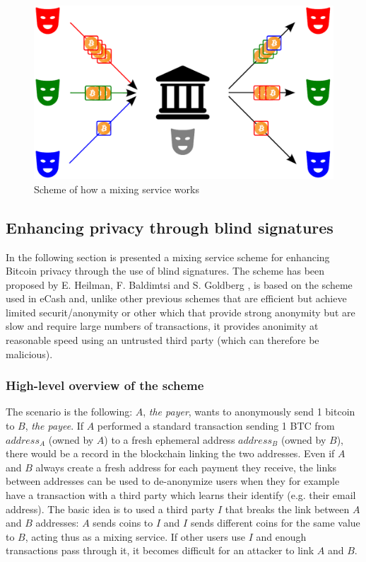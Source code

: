 \begin{figure}[!htb]
	\centering
	\includegraphics[width=1\linewidth]{img/mixing-service-scheme.png}
	\caption{Scheme of how a mixing service works}
	\label{fig:mixing-service-scheme}
\end{figure}






\subsection{Enhancing privacy through blind signatures} In the following section
is presented a mixing service scheme for enhancing Bitcoin privacy through the
use of blind signatures. The scheme has been proposed  by E. Heilman, F.
Baldimtsi and S. Goldberg \cite{heilman-blindly-signed-contracts}, is based on
the scheme used in eCash \cite{Chaum1984} and, unlike other previous schemes
that are efficient but achieve limited securit/anonymity or other which that
provide strong anonymity but are slow and require large numbers of transactions,
it provides anonimity at reasonable speed using an untrusted third party (which
can therefore be malicious).

\subsubsection{High-level overview of the scheme}
The scenario is the following: $A$, \emph{the payer}, wants to anonymously send
1 bitcoin to $B$, \emph{the  payee}. If $A$ performed a standard transaction
sending 1 BTC from $address_A$ (owned by $A$) to a fresh ephemeral address
$address_B$ (owned by $B$), there would be a record in the blockchain linking
the two addresses. Even if $A$ and $B$ always create a fresh address for each
payment they receive, the links between addresses can be used to de-anonymize
users when they for example have a transaction with a third party which learns
their identify (e.g. their email address). The basic idea is to used a third
party $I$ that breaks the link between $A$ and $B$ addresses: $A$ sends coins to
$I$ and $I$ sends different coins for the same value to $B$, acting thus as a
mixing service. If other users use $I$ and enough transactions pass through it,
it becomes difficult for an attacker to link $A$ and $B$.

